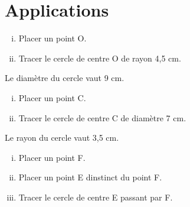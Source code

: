 \documentclass[../main.tex]{subfiles}
\begin{document}
    \part{Applications}

        \begin{exemple}
            \begin{enumerate}[i), font=\bfseries]
                \item Placer un point \textsf{O}.
                \item Tracer le cercle de centre \textsf{O} de rayon 4,5 cm.
            \end{enumerate}
            Le diamètre du cercle vaut 9 cm.
        \end{exemple}
        \begin{exemple}
            \begin{enumerate}[i), font=\bfseries]
                \item Placer un point \textsf{C}.
                \item Tracer le cercle de centre \textsf{C} de diamètre 7 cm.
            \end{enumerate}
            Le rayon du cercle vaut 3,5 cm.
        \end{exemple}
        \begin{exemple}
            \begin{enumerate}[i), font=\bfseries]
                \item Placer un point \textsf{F}.
                \item Placer un point \textsf{E} dinstinct du point \textsf{F}.
                \item Tracer le cercle de centre \textsf{E} passant par \textsf{F}.
            \end{enumerate}
        \end{exemple}
\end{document}
